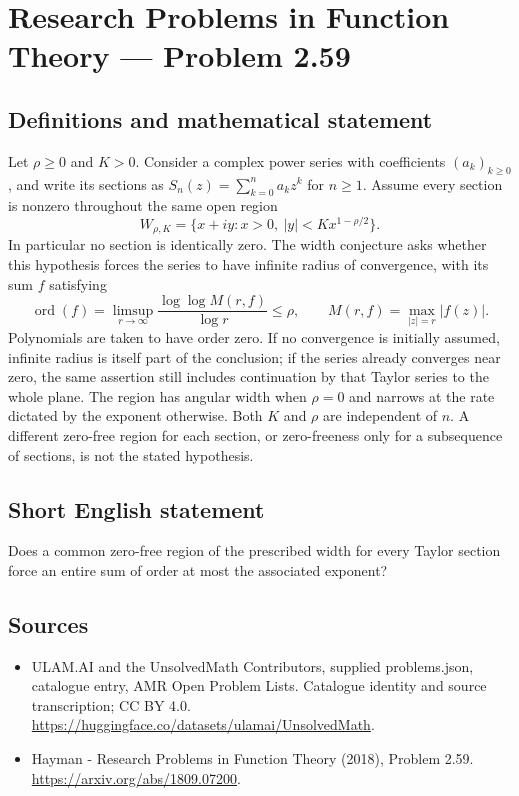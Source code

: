 \documentclass[11pt,a4paper]{article}
\begin{document}
\section*{Research Problems in Function Theory — Problem 2.59}\label{statement}

\subsection{Definitions and mathematical statement}
Let $\rho\ge0$ and $K>0$. Consider a complex power series with coefficients $(a_k)_{k\ge0}$, and write its sections as
$S_n(z)=\sum_{k=0}^na_kz^k$ for $n\ge1$.
Assume every section is nonzero throughout the same open region
\[
W_{\rho,K}=\{x+iy:x>0,\ |y|<Kx^{1-\rho/2}\}.
\]
In particular no section is identically zero. The width conjecture asks whether this hypothesis forces the series to have infinite radius of convergence, with its sum $f$ satisfying
\[
\operatorname{ord}(f)=\limsup_{r\to\infty}
\frac{\log\log M(r,f)}{\log r}\le\rho,
\qquad M(r,f)=\max_{|z|=r}|f(z)|.
\]
Polynomials are taken to have order zero. If no convergence is initially assumed, infinite radius is itself part of the conclusion; if the series already converges near zero, the same assertion still includes continuation by that Taylor series to the whole plane.
The region has angular width when $\rho=0$ and narrows at the rate dictated by the exponent otherwise. Both $K$ and $\rho$ are independent of $n$. A different zero-free region for each section, or zero-freeness only for a subsequence of sections, is not the stated hypothesis.
\subsection{Short English statement}
Does a common zero-free region of the prescribed width for every Taylor section force an entire sum of order at most the associated exponent?
\subsection{Sources}
\begin{itemize}
\item[S1] ULAM.AI and the UnsolvedMath Contributors, supplied problems.json, catalogue entry, AMR Open Problem Lists. Catalogue identity and source transcription; CC BY 4.0.
\url{https://huggingface.co/datasets/ulamai/UnsolvedMath}.
\item[S2] Hayman - Research Problems in Function Theory (2018), Problem 2.59. 
\url{https://arxiv.org/abs/1809.07200}.
\end{itemize}
\end{document}
